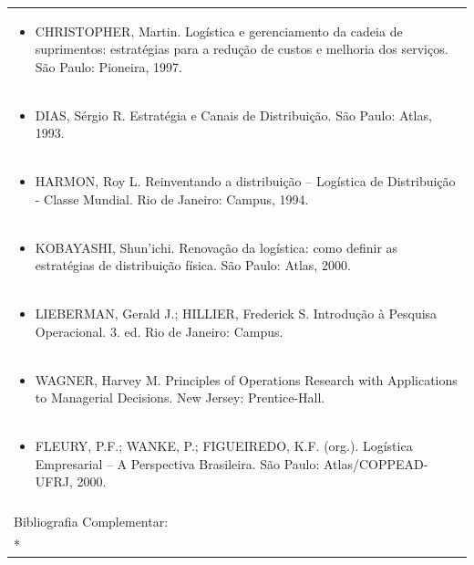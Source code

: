 \documentclass[11pt]{article}
\begin{document}
\begin{center}
\begin{longtable}{|p{4cm}|p{4cm}|p{4cm}|p{4cm}|}
\multicolumn{4}{|p{\dimexpr 16cm + 6\tabcolsep\relax}|}{\begin{itemize}\item CHRISTOPHER, Martin. Logística e gerenciamento da cadeia de suprimentos: estratégias para a redução de custos e melhoria dos serviços. São Paulo: Pioneira, 1997.\end{itemize}}\\
\multicolumn{4}{|p{\dimexpr 16cm + 6\tabcolsep\relax}|}{\begin{itemize}\item DIAS, Sérgio R. Estratégia e Canais de Distribuição. São Paulo: Atlas, 1993.\end{itemize}}\\
\multicolumn{4}{|p{\dimexpr 16cm + 6\tabcolsep\relax}|}{\begin{itemize}\item HARMON, Roy L. Reinventando a distribuição – Logística de Distribuição - Classe Mundial. Rio de Janeiro: Campus, 1994.\end{itemize}}\\
\multicolumn{4}{|p{\dimexpr 16cm + 6\tabcolsep\relax}|}{\begin{itemize}\item KOBAYASHI, Shun'ichi. Renovação da logística: como definir as estratégias de distribuição física. São Paulo: Atlas, 2000.\end{itemize}}\\
\multicolumn{4}{|p{\dimexpr 16cm + 6\tabcolsep\relax}|}{\begin{itemize}\item LIEBERMAN, Gerald J.; HILLIER, Frederick S. Introdução à Pesquisa Operacional. 3. ed. Rio de Janeiro: Campus.\end{itemize}}\\
\multicolumn{4}{|p{\dimexpr 16cm + 6\tabcolsep\relax}|}{\begin{itemize}\item WAGNER, Harvey M. Principles of Operations Research with Applications to Managerial Decisions. New Jersey: Prentice-Hall.\end{itemize}}\\
\multicolumn{4}{|p{\dimexpr 16cm + 6\tabcolsep\relax}|}{\begin{itemize}\item FLEURY, P.F.; WANKE, P.; FIGUEIREDO, K.F. (org.). Logística Empresarial – A Perspectiva Brasileira. São Paulo: Atlas/COPPEAD-UFRJ, 2000.\end{itemize}}\\
\multicolumn{4}{|p{16cm}|}{}\\
\hline
\multicolumn{4}{|p{16cm}|}{Bibliografia Complementar:}\\*
\multicolumn{4}{|p{\dimexpr 16cm + 6\tabcolsep\relax}|}{\begin{itemize}\item[] (nenhum item informado)\end{itemize}}\\
\hline
\end{longtable}
\end{center}

\clearpage
\end{document}
